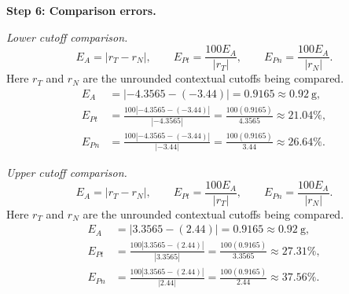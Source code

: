 \begin{enumerate}[leftmargin=*,label=\textbf{\arabic*.},itemsep=12pt,parsep=3pt,topsep=5pt]
\begin{minipage}{\linewidth}
\end{minipage}\par
\par\textbf{Step 6: Comparison errors.}\nopagebreak\enspace \par\noindent\begin{minipage}{\linewidth}
\par\textit{Lower cutoff comparison.}
\[
E_A=|r_T-r_N|,\qquad E_{Pt}=\frac{100E_A}{|r_T|},\qquad E_{Pn}=\frac{100E_A}{|r_N|}.
\]
Here $r_T$ and $r_N$ are the unrounded contextual cutoffs being compared.
\[
\begin{aligned}
E_A&=|-4.3565-(-3.44)|=0.9165\approx 0.92\ \text{g},\\
E_{Pt}&=\frac{100|-4.3565-(-3.44)|}{|-4.3565|}=\frac{100(0.9165)}{4.3565}\approx 21.04\%,\\
E_{Pn}&=\frac{100|-4.3565-(-3.44)|}{|-3.44|}=\frac{100(0.9165)}{3.44}\approx 26.64\%.
\end{aligned}
\]
\end{minipage}\par
\par\noindent\begin{minipage}{\linewidth}
\par\textit{Upper cutoff comparison.}
\[
E_A=|r_T-r_N|,\qquad E_{Pt}=\frac{100E_A}{|r_T|},\qquad E_{Pn}=\frac{100E_A}{|r_N|}.
\]
Here $r_T$ and $r_N$ are the unrounded contextual cutoffs being compared.
\[
\begin{aligned}
E_A&=|3.3565-(2.44)|=0.9165\approx 0.92\ \text{g},\\
E_{Pt}&=\frac{100|3.3565-(2.44)|}{|3.3565|}=\frac{100(0.9165)}{3.3565}\approx 27.31\%,\\
E_{Pn}&=\frac{100|3.3565-(2.44)|}{|2.44|}=\frac{100(0.9165)}{2.44}\approx 37.56\%.
\end{aligned}
\]
\end{minipage}\par


\end{enumerate}
